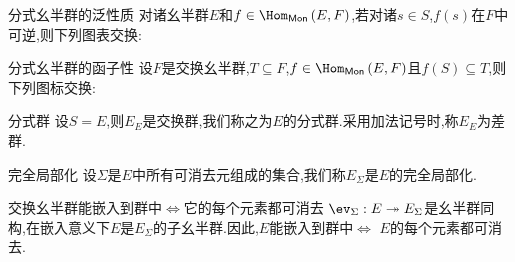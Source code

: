\begin{theorem}{分式幺半群的泛性质}{}
	对诸幺半群$E$和$f\in\Hom_{\mathsf{Mon}}\left(E,F\right)$,若对诸$s\in S$,$f\left(s\right)$在$F$中可逆,则下列图表交换:
	\begin{center}
	\end{center}
\end{theorem}

\begin{corollary}{分式幺半群的函子性}{}
	设$F$是交换幺半群,$T\subseteq F$,$f\in\Hom_{\mathsf{Mon}}\left(E,F\right)$且$f\left(S\right)\subseteq T$,则下列图标交换:
	\begin{center}
	\end{center}
\end{corollary}

\begin{definition}{分式群}{}
	设$S=E$,则$E_{E}$是交换群,我们称之为$E$的分式群.采用加法记号时,称$E_{E}$为差群.
\end{definition}

\begin{definition}{完全局部化}{}
	设$\Sigma$是$E$中所有可消去元组成的集合,我们称$E_{\Sigma}$是$E$的完全局部化.
\end{definition}

\begin{remark}{交换幺半群能嵌入到群中$\iff$它的每个元素都可消去}{}
	$\ev_{\Sigma}:E\twoheadrightarrow E_{\Sigma}$是幺半群同构,在嵌入意义下$E$是$E_{\Sigma}$的子幺半群.因此,$E$能嵌入到群中$\iff$ $E$的每个元素都可消去.
\end{remark}

































